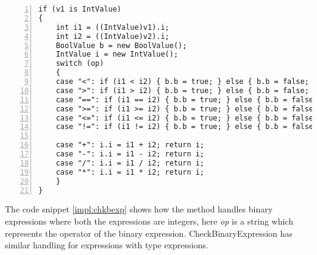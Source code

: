 		\begin{lstlisting}[basicstyle=\small\sffamily,
			keywords={break,case,const,continue,default,else,enum,
			for,if,return,switch,while,do,long,void,int,float,double,
			char,struct,typedef,include,size\_t},
			keywordstyle={\color{blue}},
			comment={[l]{//}}, morecomment={[s]{/*}{*/}}, commentstyle=\itshape,
			columns={[l]flexible}, numbers=left, numberstyle=\tiny,
			frameround=fftt, frame=shadowbox, captionpos=b,
			caption={Code snippet from CheckBinaryExpression},
			label=impl:chkbexp]
if (v1 is IntValue)
{
	int i1 = ((IntValue)v1).i;
	int i2 = ((IntValue)v2).i;
	BoolValue b = new BoolValue();
	IntValue i = new IntValue();
	switch (op)
	{
	case "<": if (i1 < i2) { b.b = true; } else { b.b = false; } return b;
	case ">": if (i1 > i2) { b.b = true; } else { b.b = false; } return b;
	case "==": if (i1 == i2) { b.b = true; } else { b.b = false; } return b;
	case ">=": if (i1 >= i2) { b.b = true; } else { b.b = false; } return b;
	case "<=": if (i1 <= i2) { b.b = true; } else { b.b = false; } return b;
	case "!=": if (i1 != i2) { b.b = true; } else { b.b = false; } return b;

	case "+": i.i = i1 + i2; return i;
	case "-": i.i = i1 - i2; return i;
	case "/": i.i = i1 / i2; return i;
	case "*": i.i = i1 * i2; return i;
	}
}
		\end{lstlisting}
		The code snippet \ref{impl:chkbexp} shows how the method handles binary expressions 
		where both the expressions are integers, here {\it op} is a string which represents the operator of the binary expression. 
		CheckBinaryExpression has similar handling for expressions with type expressions.
		
